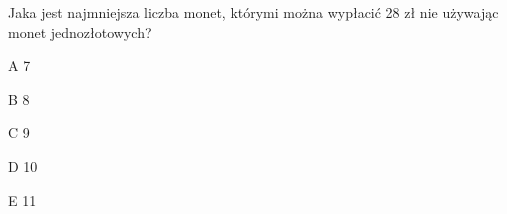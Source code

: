 \begin{tresc}
Jaka jest najmniejsza liczba monet, którymi można wypłacić 28 zł nie używając monet jednozłotowych?
\end{tresc}
\begin{wariant}{A} 7 \end{wariant}
\begin{wariant}{B} 8 \end{wariant}
\begin{wariant}{C} 9 \end{wariant}
\begin{wariant}{D} 10 \end{wariant}
\begin{wariant}{E} 11 \end{wariant}
